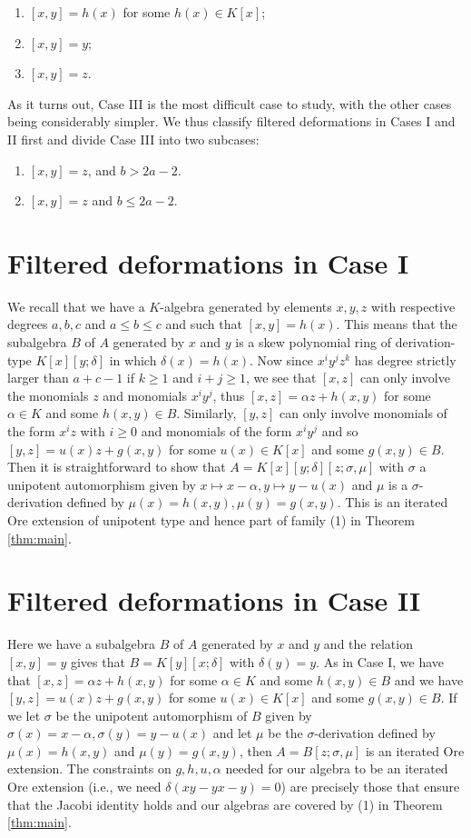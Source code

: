 \documentclass[a4paper,11pt,twoside,notitlepage,reqno]{amsart}
\theoremstyle{plain}
\numberwithin{thm}{section}
\theoremstyle{definition}
\begin{document}
\begin{enumerate}
\item[Case I:] $[x,y]=h(x)$ for some $h(x)\in K[x]$;
\item[Case II:] $[x,y]=y$;
\item[Case III:] $[x,y]=z$.
\end{enumerate}
As it turns out, Case III is the most difficult case to study, with the other cases being considerably simpler.  We thus classify filtered deformations in Cases I and II first and divide Case III into two subcases:
\begin{enumerate}
\item[Case III(a):] $[x,y]=z$, and $b>2a-2$.
\item[Case III(b):] $[x,y]=z$ and $b\le 2a-2$.
\end{enumerate}

\section{Filtered deformations in Case I}\label{sec:I}
We recall that we have a $K$-algebra generated by elements $x,y,z$ with respective degrees $a,b,c$ and $a\le b\le c$ and such that $[x,y]=h(x)$.  This means that 
the subalgebra $B$ of $A$ generated by $x$ and $y$ is a skew polynomial ring of derivation-type $K[x][y;\delta]$ in which $\delta(x)=h(x)$.  Now since $x^i y^j z^k$ has degree strictly larger than $a+c-1$ if $k\ge 1$ and $i+j\ge 1$, we see that 
$[x,z]$ can only involve the monomials $z$ and monomials $x^i y^j$, thus $[x,z]=\alpha z+ h(x,y)$ for some $\alpha\in K$ and some $h(x,y)\in B$.  Similarly, $[y,z]$ can only involve monomials of the form $x^i z$ with $i\ge 0$ and monomials of the form $x^i y^j$ and so $[y,z]=u(x) z+ g(x,y)$ for some $u(x)\in K[x]$ and some $g(x,y)\in B$.  
Then it is straightforward to show that $A=K[x][y;\delta][z;\sigma,\mu]$ with $\sigma$ a unipotent automorphism given by $x\mapsto x-\alpha, y\mapsto y-u(x)$ and $\mu$ is a $\sigma$-derivation defined by $\mu(x)=h(x,y), \mu(y)=g(x,y)$. This is an iterated Ore extension of unipotent type and hence part of family (1) in Theorem \ref{thm:main}.
\section{Filtered deformations in Case II}\label{sec:II}
Here we have a subalgebra $B$ of $A$ generated by $x$ and $y$ and the relation $[x,y]=y$ gives that $B=K[y][x;\delta]$ with $\delta(y)=y$. As in Case I, we have that
$[x,z] =\alpha z+ h(x,y)$ for some $\alpha\in K$ and some $h(x,y)\in B$ and we have $[y,z]=u(x)z + g(x,y)$ for some $u(x)\in K[x]$ and some $g(x,y)\in B$.
If we let $\sigma$ be the unipotent automorphism of $B$ given by $\sigma(x)=x-\alpha, \sigma(y)=y-u(x)$ and let $\mu$ be the $\sigma$-derivation defined by $\mu(x)=h(x,y)$ and $\mu(y)=g(x,y)$, then $A=B[z;\sigma,\mu]$ is an iterated Ore extension.  The constraints on $g,h,u,\alpha$ needed for our algebra to be an iterated Ore extension (i.e., we need $\delta(xy-yx-y)=0$) are precisely those that ensure that the Jacobi identity holds and our algebras are covered by (1) in Theorem \ref{thm:main}.  
\end{document}
